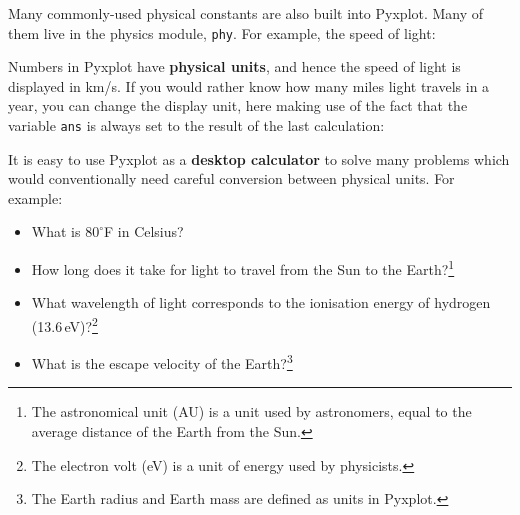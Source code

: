\vspace{3mm}

\vspace{3mm}

Many commonly-used physical constants are also built into Pyxplot. Many of them
live in the physics module, {\tt phy}. For example, the speed of light:

\vspace{3mm}

\vspace{3mm}

\noindent Numbers in Pyxplot have {\bf physical units}, and hence the speed of
light is displayed in km/s. If you would rather know how many miles light
travels in a year, you can change the display unit, here making use of the fact
that the variable {\tt ans} is always set to the result of the last
calculation:

\vspace{3mm}

\vspace{3mm}

\noindent It is easy to use Pyxplot as a {\bf desktop calculator} to solve many
problems which would conventionally need careful conversion between physical
units. For example:

\begin{itemize}
\item What is $80^\circ$F in Celsius?

\vspace{3mm}

\vspace{3mm}

\item How long does it take for light to travel from the Sun to the
Earth?\footnote{The astronomical unit (AU) is a unit used by astronomers, equal
to the average distance of the Earth from the Sun.}

\vspace{3mm}

\vspace{3mm}

\item What wavelength of light corresponds to the ionisation energy of hydrogen
(13.6\,eV)?\footnote{The electron volt (eV) is a unit of energy used by
physicists.}

\vspace{3mm}

\vspace{3mm}

\item What is the escape velocity of the Earth?\footnote{The Earth radius and
Earth mass are defined as units in Pyxplot.}

\vspace{3mm}

\vspace{3mm}
\end{itemize}

